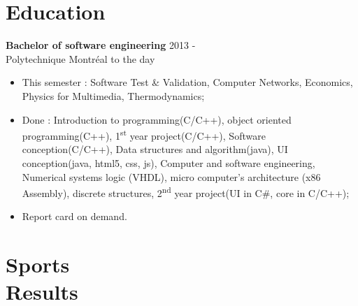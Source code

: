 \documentclass[margin]{res}
\begin{document}
\begin{resume}
    
  


  \section{Education}
  
  {\bf Bachelor of software engineering } \hfill 2013 -\\ 
  Polytechnique Montr\'{e}al \hfill to the day
  \begin{itemize} \itemsep -2pt
  \item This semester : Software Test \& Validation, Computer Networks, Economics, Physics for Multimedia, Thermodynamics;
  \item Done : Introduction to programming(C/C++), object oriented programming(C++), 1\textsuperscript{st} year project(C/C++), Software conception(C/C++), Data structures and algorithm(java), UI conception(java, html5, css, js), Computer and software engineering, Numerical systems logic (VHDL), micro computer’s architecture (x86 Assembly), discrete structures,  2\textsuperscript{nd} year project(UI in C\#, core in C/C++);
  \item Report card on demand.
  \end{itemize}
  
  




  \section{Sports \\Results}
  

\end{resume}
\end{document}

